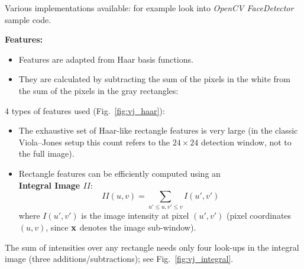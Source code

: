   Various implementations available: for example look into \textit{OpenCV FaceDetector} sample code.
 
 \textbf{Features:}

  \begin{itemize}
    \item Features are adapted from Haar basis functions. %
    \item They are calculated by subtracting the sum of the pixels in the white from the sum of the pixels in the gray rectangles:               %
  \end{itemize}

 4 types of features used (Fig.~\ref{fig:vj_haar}):
  \begin{itemize}
    \item The exhaustive set of Haar-like rectangle features is very large (in the classic Viola--Jones setup this count refers to the $24\times 24$ detection window, not to the full image). %
    \item Rectangle features can be efficiently computed using an \\
    \textbf {Integral Image $II$}:
      \begin{displaymath}
        II(u,v) = \sum_{u' \leq u, v' \leq v} I(u', v')
      \end{displaymath}
      where $I(u',v')$ is the image intensity at pixel $(u',v')$ (pixel coordinates $(u,v)$, since $\bm{\mathrm{x}}$ denotes the image sub-window).
  \end{itemize}

The sum of intensities over any rectangle needs only four look-ups in the integral image (three additions/subtractions); see Fig.~\ref{fig:vj_integral}.\\

